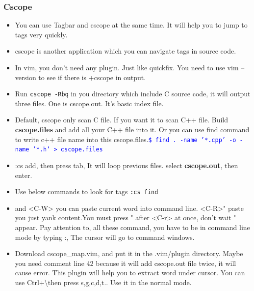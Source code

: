 \documentclass[a4paper,11pt,twoside]{book}
\newcommand{\linuxcommand}[1]{\texttt{\textcolor{blue}{\$ #1 \Pisymbol{psy}{191}}}}
\begin{document}
\subsubsection{Cscope}
\begin{itemize}

\item You can use Tagbar and cscope at the same time. It will help you to jump to tags very quickly.

\item cscope is another application which you can navigate tags in source code. 

\item In vim, you don't need any plugin. Just like quickfix. You need to use vim --version to see if there is +cscope in output. 

\item Run \verb=cscope -Rbq= in you directory which include C source code, it will output three files. One is cscope.out. It's basic index file. 

\item Default, cscope only scan C file. If you want it to scan C++ file. Build \textbf{cscope.files} and add all your C++ file into it. Or you can use find command to write c++ file name into this cscope.files.\linuxcommand{find . -name '*.cpp' -o -name '*.h' > cscope.files}

\item :cs add, then press tab, It will loop previous files. select \textbf{cscope.out}, then enter.

\item Use below commands to look for tags \verb=:cs find= 
		
\item <C-R> and <C-W> you can paste current word into command line. <C-R>" paste you just yank content.You must press " after <C-r> at once, don't wait " appear. Pay attention to, all these command, you have to be in command line mode by typing :, The cursor will go to command windows. 

\item Download cscope\_map.vim, and put it in the .vim/plugin directory. Maybe you need comment line 42 because it will add cscope.out file twice, it will cause error. This plugin will help you to extract word under cursor. You can use Ctrl+\textbackslash then press s,g,c,d,t.. Use it in the normal mode. 
  

\end{itemize}
\end{document}
